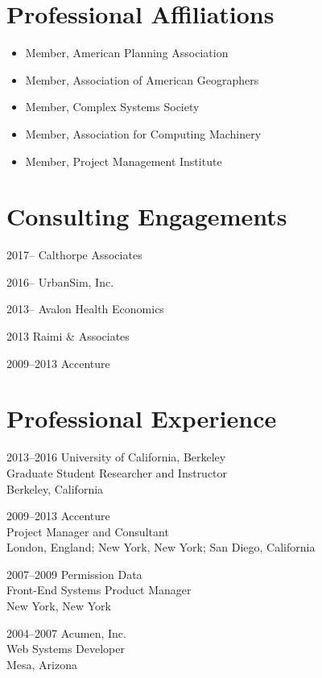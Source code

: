 \documentclass{academiccv}
\begin{document}
\section*{Professional Affiliations}

\begin{itemize}
\item Member, American Planning Association
\item Member, Association of American Geographers
\item Member, Complex Systems Society
\item Member, Association for Computing Machinery
\item Member, Project Management Institute
\end{itemize}



\section*{Consulting Engagements}

\begin{tablist}
\item[2017--]     \tab Calthorpe Associates
\item[2016--]     \tab UrbanSim, Inc.
\item[2013--]     \tab Avalon Health Economics
\item[2013]       \tab Raimi \& Associates
\item[2009--2013] \tab Accenture
\end{tablist}



\section*{Professional Experience}

\begin{tablist}
\item[2013--2016] \tab University of California, Berkeley \\
                       Graduate Student Researcher and Instructor \\
                       Berkeley, California

\item[2009--2013] \tab Accenture \\
                       Project Manager and Consultant \\
                       London, England; New York, New York; San Diego, California

\item[2007--2009] \tab Permission Data \\
                       Front-End Systems Product Manager \\
                       New York, New York

\item[2004--2007] \tab Acumen, Inc. \\
                       Web Systems Developer \\
                       Mesa, Arizona
\end{tablist}
\end{document}

